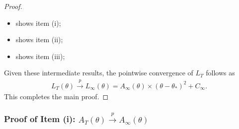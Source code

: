\documentclass[a4paper, 11pt]{article}
\theoremstyle{definition}
\begin{document}
\begin{proof}
\begin{itemize}
        \item {} shows item (i);
        \item {} shows item (ii);
        \item {} shows item (iii);
    \end{itemize}
    Given these intermediate results, the pointwise convergence of $L_T$ follows as
    \begin{align}
        L_T(\theta) \overset{p}{\longrightarrow} L_\infty(\theta) = A_\infty(\theta) \times (\theta - \theta_*)^2  + C_\infty .
    \end{align}
    This completes the main proof.
\end{proof}



\subsubsection{Proof of Item (i): $A_T(\theta) \overset{p}{\longrightarrow} A_\infty(\theta)$} \label{apx:proof_A_T_convergence}
\end{document}

